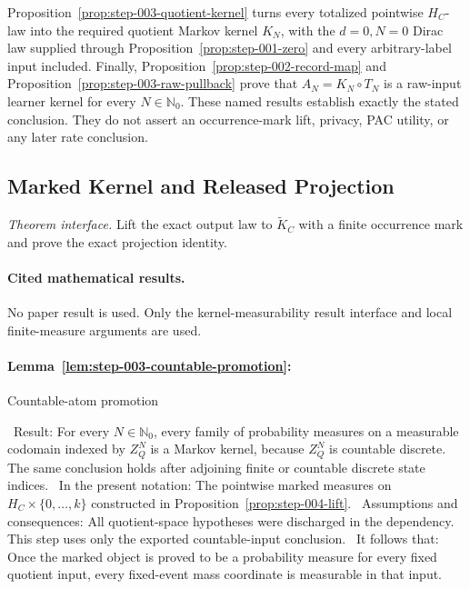 Proposition~\ref{prop:step-003-quotient-kernel} turns every totalized
pointwise \(H_C\)-law into the required quotient Markov kernel \(K_N\), with
the \(d=0,N=0\) Dirac law supplied through Proposition~\ref{prop:step-001-zero} and every arbitrary-label input
included. Finally, Proposition~\ref{prop:step-002-record-map} and
Proposition~\ref{prop:step-003-raw-pullback} prove that
\(A_N=K_N\circ T_N\) is a raw-input learner kernel for every
\(N\in\mathbb N_0\). These named results establish exactly the stated conclusion.
They do not assert an occurrence-mark lift, privacy, PAC utility, or any
later rate conclusion.



\subsection{Marked Kernel and Released Projection}\label{app:step_004}

\noindent\textit{Theorem interface.} Lift the exact output law to   \(\widetilde K_C\) with a finite occurrence mark and prove the exact   projection identity.

\paragraph{Cited mathematical results.}


No paper result is used. Only the  kernel-measurability result interface and local
finite-measure arguments are used.

\paragraph{Lemma~\ref{lem:step-003-countable-promotion}:}
Countable-atom promotion

\noindent\textbullet\ Result: For every \(N\in\mathbb N_0\), every family of
  probability measures on a measurable codomain indexed by
  \(Z_Q^N\) is a Markov kernel, because \(Z_Q^N\) is countable discrete.
  The same conclusion holds after adjoining finite or countable discrete
  state indices.
\noindent\textbullet\ In the present notation: The pointwise marked measures on
  \(H_C\times\{0,\ldots,k\}\) constructed in
  Proposition~\ref{prop:step-004-lift}.
\noindent\textbullet\ Assumptions and consequences: All quotient-space hypotheses were
  discharged in the  dependency. This step uses only the exported
  countable-input conclusion.
\noindent\textbullet\ It follows that: Once the marked object is proved to be a probability
  measure for every fixed quotient input, every fixed-event mass coordinate
  is measurable in that input.

